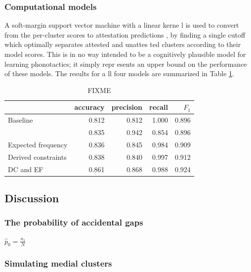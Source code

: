 \subsubsection{Computational models}

A soft-margin support vector machine \citep{Cortes1995} with a linear kerne
l is used to convert from the per-cluster scores to attestation predictions
, by finding a single cutoff which optimally separates attested and unattes
ted clusters according to their model scores. This is in no way intended to
 be a cognitively plausible model for learning phonotactics; it simply repr
esents an upper bound on the performance of these models. The results for a
ll four models are summarized in Table \ref{cmresults}.

\begin{table} 
\centering
\begin{tabular}{l | rrrr}
\toprule
                    & accuracy & precision & recall & $F_1$ \\
\midrule
Baseline            & 0.812    & 0.812     & 1.000  & 0.896 \\
\citet{Hayes2008a}  & 0.835    & 0.942     & 0.854  & 0.896 \\
Expected frequency  & 0.836    & 0.845     & 0.984  & 0.909 \\
Derived constraints & 0.838    & 0.840     & 0.997  & 0.912 \\
DC and EF           & 0.861    & 0.868     & 0.988  & 0.924 \\
\bottomrule
\end{tabular}
\caption{FIXME}
\label{cmresults}
\end{table}

\subsection{Discussion}

\subsubsection{The probability of accidental gaps}

\begin{unlabeledexample}
$\displaystyle \hat{p}_0 = \frac{n_1}{N}$
\end{unlabeledexample}


\subsubsection{Simulating medial clusters}

